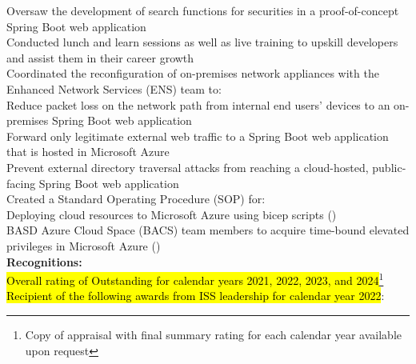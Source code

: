 \documentclass[10pt]{res} %
\begin{document}
\begin{resume}
\hspace*{3em} Oversaw the development of search functions for securities in a proof-of-concept Spring Boot web application \\
\hspace*{3em} Conducted lunch and learn sessions as well as live training to upskill developers and assist them in their career growth \\
\hspace*{3em} Coordinated the reconfiguration of on-premises network appliances with the Enhanced Network Services (ENS) team to: \\
\hspace*{3.5em}\faNetworkWired\space Reduce packet loss on the network path from internal end users' devices to an on-premises Spring Boot web application \\
\hspace*{3.5em}\faNetworkWired\space Forward only legitimate external web traffic to a Spring Boot web application that is hosted in Microsoft Azure \\
\hspace*{3.5em}\faNetworkWired\space Prevent external directory traversal attacks from reaching a cloud-hosted, public-facing Spring Boot web application \\
\hspace*{3em} Created a Standard Operating Procedure (SOP) for: \\
\hspace*{4em}\faFile*[regular]\space Deploying cloud resources to Microsoft Azure using bicep scripts ({\underline{}}) \\
\hspace*{4em}\faFile*[regular]\space BASD Azure Cloud Space (BACS) team members to acquire time-bound elevated privileges in Microsoft Azure ({\underline{}}) \\
\hspace*{2em} {\bf Recognitions:} \\
\hspace*{3em}\faAward\space \hl{Overall rating of Outstanding for calendar years 2021, 2022, 2023, and 2024}\footnote{Copy of appraisal with final summary rating for each calendar year available upon request} \\
\hspace*{3em}\faAward\space \hl{Recipient of the following awards from ISS leadership for calendar year 2022}: \\

\end{resume}
\end{document}
